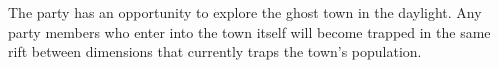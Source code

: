 The party has an opportunity to explore the ghost town in the daylight.
Any party members who enter into the town itself will become trapped in the same rift between dimensions that currently traps the town's population.

